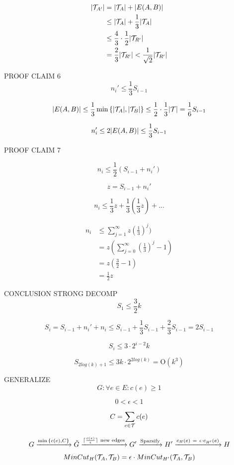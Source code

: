 \documentclass[headsepline,footsepline,footinclude=false,oneside,fontsize=11pt,paper=a4,listof=totoc,bibliography=totoc]{scrbook} %
\begin{document}
\begin{align*}
|\mathcal{T}_{A'}| & = |\mathcal{T}_{A}| + |E(A,B)| \\
& \leq |\mathcal{T}_{A}| + \frac{1}{3}|\mathcal{T}_{A}| \\
& \leq \frac{4}{3} \cdot \frac{1}{2} |\mathcal{T}_{R'}| \\
& = \frac{2}{3} |\mathcal{T}_{R'}| < \frac{1}{\sqrt{2}} |\mathcal{T}_{R'}|
\end{align*}

PROOF CLAIM 6
\[
n_i' \leq \frac{1}{3} S_{i-1}
\]

\[
|E(A,B)| \leq \frac{1}{3}\min{\{|\mathcal{T}_A|, |\mathcal{T}_B|\}} \leq \frac{1}{2}\cdot\frac{1}{3}|\mathcal{T}| = \frac{1}{6}S_{i-1}\\
\]

\[
n_i' \leq 2 |E(A,B)| \leq \frac{1}{3} S_{i-1}
\]

PROOF CLAIM 7

\[
n_i \leq \frac{1}{2} (S_{i-1} + n_i')
\]

\[
z = S_{i-1} + n_i'
\]

\[
n_i \leq \frac{1}{3}z + \frac{1}{3}(\frac{1}{3}z) + ...
\]

\begin{align*}
n_i & \leq \sum_{j = 1}^{\infty} z (\frac{1}{3})^j) \\
& = z (\sum_{j = 0}^{\infty} (\frac{1}{3})^j - 1) \\
& = z (\frac{3}{2} - 1) \\
& = \frac{1}{2}z
\end{align*}

CONCLUSION STRONG DECOMP
\[
S_1 \leq \frac{3}{2}k
\]

\[
S_i = S_{i-1} + n_i' + n_i \leq S_{i-1} + \frac{1}{3}S_{i-1} + \frac{2}{3}S_{i-1} = 2S_{i-1}
\]

\[
S_i \leq 3 \cdot 2^{i-2}k
\]

\[
S_{2log(k)+1} \leq 3k \cdot 2^{2log(k)} = \mathrm{O}(k^3)
\]

GENERALIZE
\[
G: \forall e \in E: c(e) \geq 1
\]

\[
0 < \epsilon < 1
\]

\[
C = \sum_{e \in \mathcal{T}} c(e)
\]

\[
G 
\xrightarrow{\min{\{c(e), C\}}} 
\tilde{G}
\xrightarrow{\lceil\frac{c(e)}{\epsilon}\rceil \ \text{new edges}}
G'
\xrightarrow{\text{Sparsify}}
H'
\xrightarrow{c_H(e) \ = \ \epsilon \cdot c_{H'}(e)}
H
\]

\[
MinCut_{H}(\mathcal{T}_A, \mathcal{T}_B) = \epsilon \cdot MinCut_{H'}(\mathcal{T}_A, \mathcal{T}_B)
\]
\end{document}
